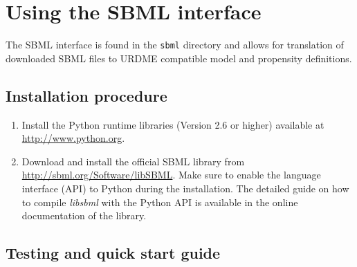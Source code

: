 \section{Using the SBML interface}
\label{sec:sbml}
The SBML interface is found in the \texttt{sbml} directory and allows for translation of downloaded SBML files to URDME
compatible model and propensity definitions.

\subsection{Installation procedure}

\begin{enumerate}

\item Install the Python runtime libraries (Version 2.6 or higher)
available at \url{http://www.python.org}.

\item Download and install the official SBML library from \url{http://sbml.org/Software/libSBML}.
Make sure to enable the language interface (API) to Python during the installation.  The detailed guide on
how to compile \textit{libsbml} with the Python API is available in the online documentation of the library.

\end{enumerate}

\subsection{Testing and quick start guide}

